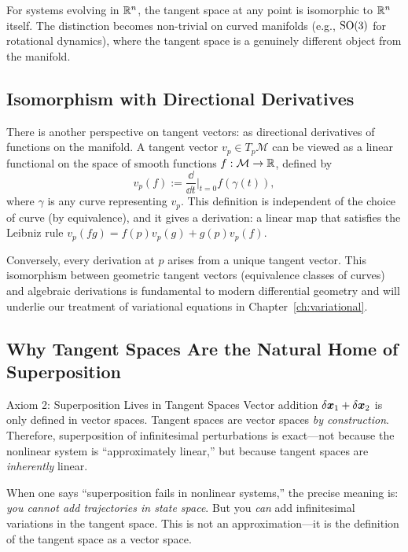 For systems evolving in $\mathbb{R}^n$, the tangent space at any point is isomorphic to $\mathbb{R}^n$
itself. The distinction becomes non-trivial on curved manifolds (e.g., $\mathrm{SO}(3)$ for
rotational dynamics), where the tangent space is a genuinely different object from the
manifold.

\subsection{Isomorphism with Directional Derivatives}

There is another perspective on tangent vectors: as directional derivatives of functions
on the manifold. A tangent vector $v_p \in T_p\mathcal{M}$ can be viewed as a linear
functional on the space of smooth functions $f: \mathcal{M} \to \mathbb{R}$, defined by
\begin{equation}
v_p(f) := \frac{\dd}{\dd t}\Big|_{t=0} f(\gamma(t)),
\label{eq:ch1:tangent-derivative}
\end{equation}
where $\gamma$ is any curve representing $v_p$. This definition is independent of the choice
of curve (by equivalence), and it gives a derivation: a linear map that satisfies the
Leibniz rule $v_p(fg) = f(p) v_p(g) + g(p) v_p(f)$.

Conversely, every derivation at $p$ arises from a unique tangent vector. This isomorphism
between geometric tangent vectors (equivalence classes of curves) and algebraic derivations
is fundamental to modern differential geometry and will underlie our treatment of variational
equations in Chapter~\ref{ch:variational}.

\subsection{Why Tangent Spaces Are the Natural Home of Superposition}

\begin{axiombox}{Axiom 2: Superposition Lives in Tangent Spaces}
Vector addition $\delta\bm{x}_1 + \delta\bm{x}_2$ is only defined in vector spaces. Tangent spaces are
vector spaces \emph{by construction}. Therefore, superposition of infinitesimal
perturbations is exact---not because the nonlinear system is ``approximately linear,''
but because tangent spaces are \emph{inherently} linear.
\end{axiombox}

When one says ``superposition fails in nonlinear systems,'' the precise meaning is:
\emph{you cannot add trajectories in state space}. But you \emph{can} add infinitesimal
variations in the tangent space. This is not an approximation---it is the definition of
the tangent space as a vector space.

